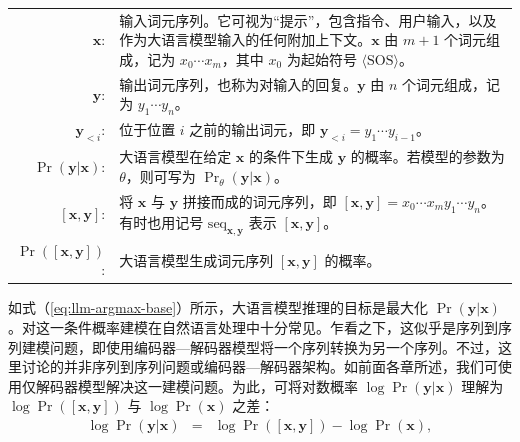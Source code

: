 \vspace{0.5em}
\begingroup
\setlength{\tabcolsep}{5pt}
\begin{tabular}{r l l}
$\mathbf{x}$: & \multicolumn{2}{p{0.75\textwidth}}{
输入词元序列。它可视为“提示”，包含指令、用户输入，以及作为大语言模型输入的任何附加上下文。$\mathbf{x}$ 由 $m+1$ 个词元组成，记为 $x_0\cdots x_m$，其中 $x_0$ 为起始符号 $\langle \mathrm{SOS} \rangle$。
\vspace{0.5em}
} \\
$\mathbf{y}$: & \multicolumn{2}{p{0.75\textwidth}}{
输出词元序列，也称为对输入的回复。$\mathbf{y}$ 由 $n$ 个词元组成，记为 $y_1\cdots y_n$。
\vspace{0.5em}
} \\
$\mathbf{y}_{<i}$: & \multicolumn{2}{p{0.75\textwidth}}{
位于位置 $i$ 之前的输出词元，即 $\mathbf{y}_{<i} = y_1\cdots y_{i-1}$。
\vspace{0.5em}
} \\
$\Pr(\mathbf{y}|\mathbf{x})$: & \multicolumn{2}{p{0.75\textwidth}}{
大语言模型在给定 $\mathbf{x}$ 的条件下生成 $\mathbf{y}$ 的概率。若模型的参数为 $\theta$，则可写为 $\Pr_{\theta}(\mathbf{y}|\mathbf{x})$。
\vspace{0.5em}
} \\
$[\mathbf{x},\mathbf{y}]$: & \multicolumn{2}{p{0.75\textwidth}}{
将 $\mathbf{x}$ 与 $\mathbf{y}$ 拼接而成的词元序列，即 $[\mathbf{x},\mathbf{y}] = x_0 \cdots x_m y_1 \cdots y_n$。有时也用记号 $\mathrm{seq}_{\mathbf{x},\mathbf{y}}$ 表示 $[\mathbf{x},\mathbf{y}]$。
\vspace{0.5em}
} \\
$\Pr([\mathbf{x},\mathbf{y}])$: & \multicolumn{2}{p{0.75\textwidth}}{
大语言模型生成词元序列 $[\mathbf{x},\mathbf{y}]$ 的概率。
\vspace{0.5em}
}
\end{tabular}
\endgroup
\vspace{0.5em}

如式（\ref{eq:llm-argmax-base}）所示，大语言模型推理的目标是最大化 $\Pr(\mathbf{y}|\mathbf{x})$。对这一条件概率建模在自然语言处理中十分常见。乍看之下，这似乎是序列到序列建模问题，即使用编码器—解码器模型将一个序列转换为另一个序列。不过，这里讨论的并非序列到序列问题或编码器—解码器架构。如前面各章所述，我们可使用仅解码器模型解决这一建模问题。为此，可将对数概率 $\log \Pr(\mathbf{y}|\mathbf{x})$ 理解为 $\log \Pr([\mathbf{x},\mathbf{y}])$ 与 $\log \Pr(\mathbf{x})$ 之差：
\begin{eqnarray}
\log \Pr(\mathbf{y}|\mathbf{x}) & = & \log \Pr([\mathbf{x},\mathbf{y}]) - \log \Pr(\mathbf{x}),
\end{eqnarray}

